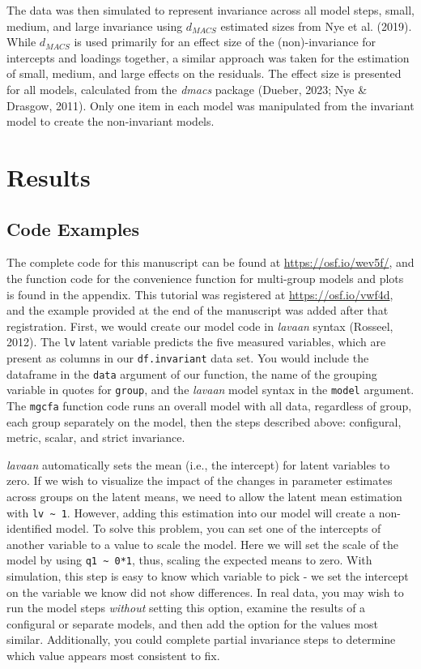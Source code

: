 \documentclass[
  man]{apa7}
\begin{document}
The data was then simulated to represent invariance across all model steps, small, medium, and large invariance using \(d_{MACS}\) estimated sizes from Nye et al. (2019). While \(d_{MACS}\) is used primarily for an effect size of the (non)-invariance for intercepts and loadings together, a similar approach was taken for the estimation of small, medium, and large effects on the residuals. The effect size is presented for all models, calculated from the \emph{dmacs} package (Dueber, 2023; Nye \& Drasgow, 2011). Only one item in each model was manipulated from the invariant model to create the non-invariant models.

\hypertarget{results}{%
\section{Results}\label{results}}

\hypertarget{code-examples}{%
\subsection{Code Examples}\label{code-examples}}

The complete code for this manuscript can be found at \url{https://osf.io/wev5f/}, and the function code for the convenience function for multi-group models and plots is found in the appendix. This tutorial was registered at \url{https://osf.io/vwf4d}, and the example provided at the end of the manuscript was added after that registration. First, we would create our model code in \emph{lavaan} syntax (Rosseel, 2012). The \texttt{lv} latent variable predicts the five measured variables, which are present as columns in our \texttt{df.invariant} data set. You would include the dataframe in the \texttt{data} argument of our function, the name of the grouping variable in quotes for \texttt{group}, and the \emph{lavaan} model syntax in the \texttt{model} argument. The \texttt{mgcfa} function code runs an overall model with all data, regardless of group, each group separately on the model, then the steps described above: configural, metric, scalar, and strict invariance.

\emph{lavaan} automatically sets the mean (i.e., the intercept) for latent variables to zero. If we wish to visualize the impact of the changes in parameter estimates across groups on the latent means, we need to allow the latent mean estimation with \texttt{lv\ \textasciitilde{}\ 1}. However, adding this estimation into our model will create a non-identified model. To solve this problem, you can set one of the intercepts of another variable to a value to scale the model. Here we will set the scale of the model by using \texttt{q1\ \textasciitilde{}\ 0*1}, thus, scaling the expected means to zero. With simulation, this step is easy to know which variable to pick - we set the intercept on the variable we know did not show differences. In real data, you may wish to run the model steps \emph{without} setting this option, examine the results of a configural or separate models, and then add the option for the values most similar. Additionally, you could complete partial invariance steps to determine which value appears most consistent to fix.
\end{document}

